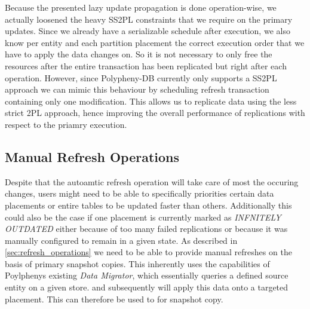 Because the presented lazy update propagation is done operation-wise, we actually loosened the heavy SS2PL constraints that we require on the primary updates. 
Since we already have a serializable schedule after execution, we also know per entity and each partition placement 
the correct execution order that we have to apply the data changes on. So it is not necessary to only free the resources 
after the entire transaction has been replicated but right after each operation. 
However, since Polypheny-DB currently only supports a SS2PL approach we can 
mimic this behaviour by scheduling refresh transaction containing only one modification.
This allows us to replicate data using the less strict 2PL approach, hence improving the overall performance of replications with respect to the priamry execution.








\subsection{Manual Refresh Operations}
\label{sec:manual_refresh}

Despite that the autoamtic refresh operation will take care of most the occuring changes, users might need to be able to specifically priorities certain data placements 
or entire tables to be updated faster than others. Additionally this could also be the case if one placement is currently marked as \emph{INFNITELY OUTDATED}
either because of too many failed replications or because it was manually configured to remain in a given state. 
As described in \ref{sec:refresh_operations} we need to be able to provide manual refreshes on the basis of primary snapshot copies.
This inherently uses the capabilities of Poylphenys existing \emph{Data Migrator}, which essentially queries a defined source entity on a given store.
and subsequently will apply this data onto a targeted placement.
This can therefore be used to for snapshot copy.

